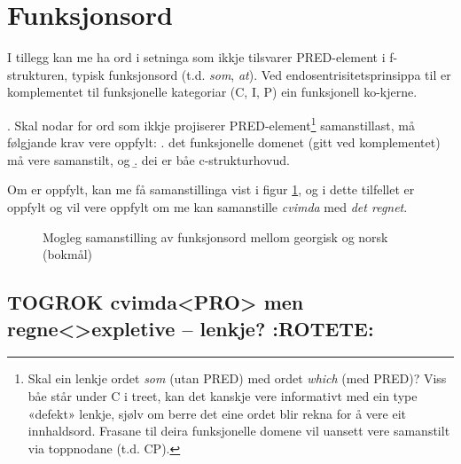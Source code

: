 \documentclass[11pt,a4paper,oneside,draft]{book}
\begin{document}
\section{Funksjonsord}
\label{sec-3.8}

\label{SEC:fnord}
I tillegg kan me ha ord i setninga som ikkje tilsvarer PRED-element i
f-strukturen, typisk funksjonsord (t.d. \emph{som}, \emph{at}). Ved
endosentrisitetsprinsippa til \citet{bresnan2001lfs} er komplementet
til funksjonelle kategoriar (C, I, P) ein funksjonell ko-kjerne. 

\ex. \label{fnordkrav} Skal nodar for ord som ikkje projiserer
     PRED-element\footnote{Skal ein lenkje ordet \emph{som} (utan PRED) med ordet \emph{which} (med
 PRED)? Viss båe står under C i treet, kan det kanskje vere
 informativt med ein type «defekt» lenkje, sjølv om berre det eine
 ordet blir rekna for å vere eit innhaldsord. Frasane til deira
 funksjonelle domene vil uansett vere samanstilt via toppnodane
 (t.d. CP). } samanstillast, må følgjande krav vere oppfylt:
\a. det funksjonelle domenet (gitt ved komplementet) må vere
   samanstilt, og
\b. dei er båe c-strukturhovud.


Om \Last[a og -b] er oppfylt, kan me få samanstillinga vist i figur
\ref{fig:fnord}, og i dette tilfellet er \Last[b] oppfylt og \Last[a]
vil vere oppfylt om me kan samanstille \emph{cvimda} med \emph{det regnet}.

  \begin{figure}[htp]
   \vfill{} %
  
  \caption{Mogleg samanstilling av funksjonsord mellom georgisk og norsk (bokmål)}
   \label{fig:fnord}
  \end{figure}
\subsection{\textbf{TOGROK} cvimda<PRO> men regne<>expletive -- lenkje? \textbf{:ROTETE:}}
\label{sec-3.8.1}
\end{document}
